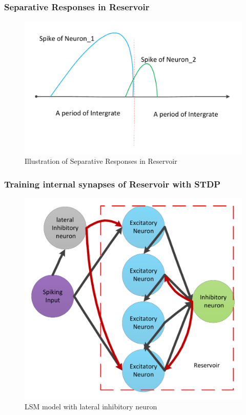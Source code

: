 \documentclass[10pt,aspectratio=43,mathserif, notes]{beamer}
\begin{document}
		\begin{frame}
		  \frametitle{\textbf{Separative Responses in Reservoir}}
            \begin{figure}[htb]
            \centering
            \includegraphics[width=0.9\linewidth]{image/Separative_Responses_in_Reservoir.pdf}
            \caption{Illustration of Separative Responses in Reservoir}
            \label{Separative_R_2}
            \end{figure}            		
		\end{frame}

		\begin{frame}
		  \frametitle{\textbf{Training internal synapses of Reservoir with STDP}}
		    \begin{figure}[htb]
            \centering
            \includegraphics[width=0.6\linewidth]{image/LSM_model.pdf}
            \caption{LSM model with lateral inhibitory neuron}
            \label{Separative_R_2}
            \end{figure}
		\end{frame}

%		
\end{document}
